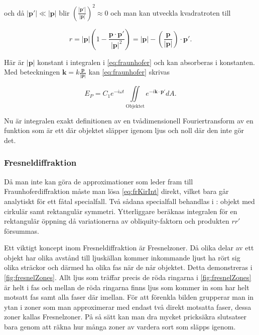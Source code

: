 \documentclass[a4paper]{article}
\begin{document}
och då $|\boldsymbol{p'}|\ll|\boldsymbol{p}|$ blir $\left(\frac{|\boldsymbol{p'}|}{|\boldsymbol{p}|}\right)^2\approx 0$ och man kan utveckla kvadratroten till

\begin{equation}
	r = |\boldsymbol{p}|\left( 1 - \frac{\boldsymbol{p}\cdot\boldsymbol{p'}}{|\boldsymbol{p}|^2} \right) = |\boldsymbol{p}| - \left(\frac{\boldsymbol{p}}{|\boldsymbol{p}|}\right)\cdot\boldsymbol{p'}\text{.}
\end{equation}

Här är $|\boldsymbol{p}|$ konstant i integralen i \eqref{eq:fraunhofer} och kan absorberas i konstanten. Med beteckningen $\boldsymbol{k} = k \frac{\boldsymbol{p}}{|\boldsymbol{p}|}$ kan \eqref{eq:fraunhofer} skrivas

\begin{equation}
	E_P = C_1 e^{-i \omega t} \iint\limits_{\mathrm{Objektet}} {e^{-i \boldsymbol{k}\cdot\boldsymbol{p'}} dA}\text{.}
\end{equation}

Nu är integralen exakt definitionen av en tvådimensionell Fouriertransform av en funktion som är ett där objektet släpper igenom ljus och noll där den inte gör det.

\subsubsection{Fresneldiffraktion}

Då man inte kan göra de approximationer som leder fram till Fraunhoferdiffraktion måste man lösa \eqref{eq:frKirInt} direkt, vilket bara går analytiskt för ett fåtal specialfall. Två sådana specialfall behandlas i \cite{pearsonIntroOpt}: objekt med cirkulär samt rektangulär symmetri. Ytterliggare beräknas integralen för en rektangulär öppning då variationerna av obliquity-faktorn och produkten $r r'$ försummas.

Ett viktigt koncept inom Fresneldiffraktion är Fresnelzoner. Då olika delar av ett objekt har olika avstånd till ljuskällan kommer inkommande ljust ha rört sig olika sträckor och därmed ha olika fas när de når objektet. Detta demonstreras i \autoref{fig:fresnelZones}. Allt ljus som träffar precis de röda ringarna i \autoref{fig:fresnelZones} är helt i fas och mellan de röda ringarna finns ljus som kommer in som har helt motsatt fas samt alla faser där imellan. För att förenkla bilden grupperar man in ytan i zoner som man approximerar med endast två direkt motsatta faser, dessa zoner kallas Fresnelzoner. På så sätt kan man dra mycket pricksäkra slutsatser bara genom att räkna hur många zoner av vardera sort som släpps igenom.
\end{document}

